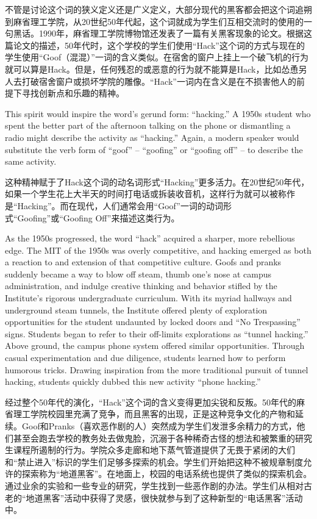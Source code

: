 \ifdefined\chs
不管是讨论这个词的狭义定义还是广义定义，大部分现代的黑客都会把这个词追朔到麻省理工学院，从20世纪50年代起，这个词就成为学生们互相交流时的使用的一句黑话。1990年，麻省理工学院博物馆还发表了一篇有关黑客现象的论文。根据这篇论文的描述，50年代时，这个学校的学生们使用“Hack”这个词的方式与现在的学生使用“Goof（混混）”一词的含义类似。在宿舍的窗户上挂上一个破飞机的行为就可以算是Hack。但是，任何残忍的或恶意的行为就不能算是Hack，比如怂恿另人去打破宿舍窗户或损坏学院的雕像。“Hack”一词内在含义是在不损害他人的前提下寻找创新点和乐趣的精神。
\fi

\ifdefined\eng
This spirit would inspire the word's gerund form: ``hacking.'' A 1950s student who spent the better part of the afternoon talking on the phone or dismantling a radio might describe the activity as ``hacking.'' Again, a modern speaker would substitute the verb form of ``goof'' -- ``goofing'' or ``goofing off'' -- to describe the same activity.
\fi

\ifdefined\chs
这种精神赋于了Hack这个词的动名词形式“Hacking”更多活力。在20世纪50年代，如果一个学生花上大半天的时间打电话或拆装收音机，这样行为就可以被称作是“Hacking”。而在现代，人们通常会用“Goof”一词的动词形式“Goofing”或“Goofing Off”来描述这类行为。
\fi

\ifdefined\eng
As the 1950s progressed, the word ``hack'' acquired a sharper, more rebellious edge. The MIT of the 1950s was overly competitive, and hacking emerged as both a reaction to and extension of that competitive culture. Goofs and pranks suddenly became a way to blow off steam, thumb one's nose at campus administration, and indulge creative thinking and behavior stifled by the Institute's rigorous undergraduate curriculum. With its myriad hallways and underground steam tunnels, the Institute offered plenty of exploration opportunities for the student undaunted by locked doors and ``No Trespassing'' signs. Students began to refer to their off-limits explorations as ``tunnel hacking.'' Above ground, the campus phone system offered similar opportunities. Through casual experimentation and due diligence, students learned how to perform humorous tricks. Drawing inspiration from the more traditional pursuit of tunnel hacking, students quickly dubbed this new activity ``phone hacking.''
\fi

\ifdefined\chs
经过整个50年代的演化，“Hack”这个词的含义变得更加尖锐和反叛。50年代的麻省理工学院校园里充满了竞争，而且黑客的出现，正是这种竞争文化的产物和延续。Goof和Pranks（喜欢恶作剧的人）突然成为学生们发泄多余精力的方式，他们甚至会跑去学校的教务处去做鬼脸，沉溺于各种稀奇古怪的想法和被繁重的研究生课程所遏制的行为。学院众多走廊和地下蒸气管道提供了无畏于紧闭的大们和“禁止进入”标识的学生们足够多探索的机会。学生们开始把这种不被规章制度允许的探索称为“地道黑客”。在地面上，校园的电话系统也提供了类似的探索机会。通过业余的实验和一些专业的研究，学生找到一些恶作剧的办法。学生们从相对古老的“地道黑客”活动中获得了灵感，很快就参与到了这种新型的“电话黑客”活动中。
\fi

